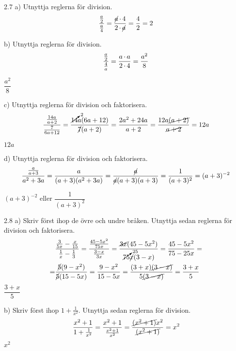 \begin{task}{2.7 a)}
	Utnyttja reglerna för division.
	\[\dfrac{\frac{a}{2}}{\frac{a}{4}}=
	\dfrac{\cancel{a}\operatorname{\cdot}4}{2\operatorname{\cdot}\cancel{a}}=
	\dfrac{4}{2}=
	2\]
	
\end{task}

\begin{task}{b)}
	Utnyttja reglerna för division.
	\[\dfrac{\frac{a}{2}}{\frac{4}{a}}=
	\dfrac{a\operatorname{\cdot}a}{2\operatorname{\cdot}4}=
	\dfrac{a^2}{8}\]
	
	\ans $\dfrac{a^2}{8}$
\end{task}

\begin{task}{c)}
	Utnyttja reglerna för division och faktorisera.
	\[\dfrac{\frac{14a}{a+2}}{\frac{7}{6a+12}}=
	\dfrac{\cancelto{2}{14}a(6a+12)}{\cancel{7}(a+2)}=
	\dfrac{2a^2+24a}{a+2}=\dfrac{12a\cancel{(a+2)}}{\cancel{a+2}}=
	12a\]
	
	\ans $12a$
\end{task}

\begin{task}{d)}
	Utnyttja reglerna för division och faktorisera.
	\[\dfrac{\frac{a}{a+3}}{a^2+3a}=
	\dfrac{a}{(a+3)(a^2+3a)}=
	\dfrac{\cancel{a}}{\cancel{a}(a+3)(a+3)}=
	\dfrac{1}{(a+3)^2}=
	(a+3)^{-2}\]
	
	\ans $(a+3)^{-2}$ eller $\dfrac{1}{(a+3)^2}$
\end{task}

\begin{task}{2.8 a)}
	Skriv först ihop de övre och undre bråken. Utnyttja sedan reglerna för division och faktorisera.
	\begin{align*}
		&\dfrac{\frac{3}{5x}-\frac{x}{15}}{\frac{1}{x}-\frac{1}{3}}=
		\dfrac{\frac{45-5x^2}{75x}}{\frac{3-x}{3x}}=
		\dfrac{\cancel{3x}(45-5x^2)}{\cancelto{25}{75}\cancel{x}(3-x)}=
		\dfrac{45-5x^2}{75-25x}= \\ =
		&\dfrac{\cancel{5}(9-x^2)}{\cancel{5}(15-5x)}=
		\dfrac{9-x^2}{15-5x}=
		\dfrac{(3+x)\cancel{(3-x)}}{5\cancel{(3-x)}}=
		\dfrac{3+x}{5}
	\end{align*}
	\ans $\dfrac{3+x}{5}$
\end{task}

\begin{task}{b)}
	Skriv först ihop $1+\frac{1}{x^2}$. Utnyttja sedan reglerna för division.
	\[\dfrac{x^2+1}{1+\frac{1}{x^2}}=
	\dfrac{x^2+1}{\frac{x^2+1}{x^2}}=
	\dfrac{\cancel{(x^2+1)}x^2}{\cancel{(x^2+1)}}=
	x^2\]
	\ans $x^2$
\end{task}

